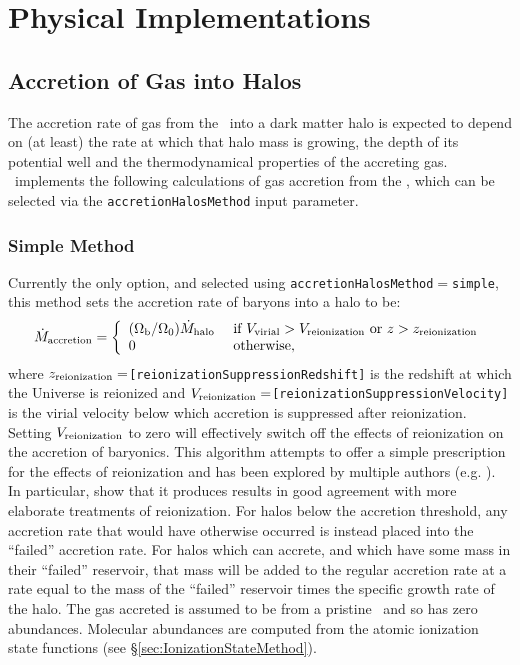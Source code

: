 \chapter{Physical Implementations}

\section{Accretion of Gas into Halos}\label{sec:AccretionBaryonic}

The accretion rate of gas from the \IGM\ into a dark matter halo is expected to depend on (at least) the rate at which that halo mass is growing, the depth of its potential well and the thermodynamical properties of the accreting gas. \glc\ implements the following calculations of gas accretion from the \IGM, which can be selected via the {\tt accretionHalosMethod} input parameter.

\subsection{Simple Method}

Currently the only option, and selected using {\tt accretionHalosMethod}$=${\tt simple}, this method sets the accretion rate of baryons into a halo to be:
\begin{equation}
 \dot{M}_{\rm accretion} = \left\{ \begin{array}{ll} (\Omega_{\rm b}/\Omega_0) \dot{M}_{\rm halo} & \hbox{ if } V_{\rm virial} > V_{\rm reionization} \hbox{ or } z > z_{\rm reionization} \\ 0 & \hbox{ otherwise,}\end{array} \right.
\end{equation}
where $z_{\rm reionization}=${\tt [reionizationSuppressionRedshift]} is the redshift at which the Universe is reionized and $V_{\rm reionization}=${\tt [reionizationSuppressionVelocity]} is the virial velocity below which accretion is suppressed after reionization. Setting $V_{\rm reionization}$ to zero will effectively switch off the effects of reionization on the accretion of baryonics. This algorithm attempts to offer a simple prescription for the effects of reionization and has been explored by multiple authors (e.g. \citealt{benson_effects_2002}). In particular, \cite{font_modelingmilky_2010} show that it produces results in good agreement with more elaborate treatments of reionization. For halos below the accretion threshold, any accretion rate that would have otherwise occurred is instead placed into the ``failed'' accretion rate. For halos which can accrete, and which have some mass in their ``failed'' reservoir, that mass will be added to the regular accretion rate at a rate equal to the mass of the ``failed'' reservoir times the specific growth rate of the halo. The gas accreted is assumed to be from a pristine \IGM\ and so has zero abundances. Molecular abundances are computed from the atomic ionization state functions (see \S\ref{sec:IonizationStateMethod}).

